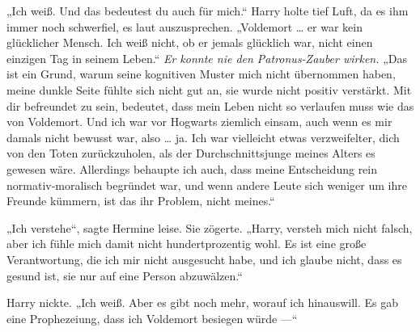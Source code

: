 „Ich weiß. Und das bedeutest du auch für mich.“
Harry holte tief Luft, da es ihm immer noch schwerfiel, es laut auszusprechen.
„Voldemort … er war kein glücklicher Mensch. Ich weiß nicht, ob er jemals glücklich war, nicht einen einzigen Tag in seinem Leben.“
\emph{Er konnte nie den Patronus-Zauber wirken.}
„Das ist ein Grund, warum seine kognitiven Muster mich nicht übernommen haben, meine dunkle Seite fühlte sich nicht gut an, sie wurde nicht positiv verstärkt. Mit dir befreundet zu sein, bedeutet, dass mein Leben nicht so verlaufen muss wie das von Voldemort. Und ich war vor Hogwarts ziemlich einsam, auch wenn es mir damals nicht bewusst war, also … ja. Ich war vielleicht etwas verzweifelter, dich von den Toten zurückzuholen, als der Durchschnittsjunge meines Alters es gewesen wäre. Allerdings behaupte ich auch, dass meine Entscheidung rein normativ-moralisch begründet war, und wenn andere Leute sich weniger um ihre Freunde kümmern, ist das ihr Problem, nicht meines.“

„Ich verstehe“, sagte Hermine leise. Sie zögerte.
„Harry, versteh mich nicht falsch, aber ich fühle mich damit nicht hundertprozentig wohl. Es ist eine große Verantwortung, die ich mir nicht ausgesucht habe, und ich glaube nicht, dass es gesund ist, sie nur auf eine Person abzuwälzen.“

Harry nickte.
„Ich weiß. Aber es gibt noch mehr, worauf ich hinauswill. Es gab eine Prophezeiung, dass ich Voldemort besiegen würde —“


